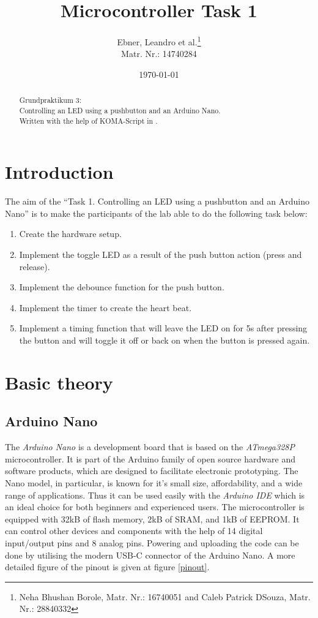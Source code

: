 \documentclass{scrartcl}                    %
\begin{document}
\title{Microcontroller Task 1}
\author{Ebner, Leandro et al.\thanks{Neha Bhushan Borole, Matr. Nr.: 16740051 and Caleb Patrick DSouza, Matr. Nr.: 28840332} \\ Matr. Nr.: 14740284}
\date{\today}
\maketitle

\begin{abstract}
Grundpraktikum 3: \\ Controlling an LED using a pushbutton and an Arduino Nano. \\
Written with the help of KOMA-Script in \LaTeXe{}.
\end{abstract}

\tableofcontents

\section{Introduction}

The aim of the “Task 1. Controlling an LED using a pushbutton and an Arduino Nano” is to make the participants of the lab able to do the following task below:

\begin{enumerate}
    \item Create the hardware setup.
    \item Implement the toggle LED as a result of the push button action (press and release).
    \item Implement the debounce function for the push button.
    \item Implement the timer to create the heart beat.
    \item Implement a timing function that will leave the LED on for 5s after pressing the button and will toggle it off or back on when the button is pressed again.
\end{enumerate}

\section{Basic theory}
    \subsection{Arduino Nano}
    
    The \emph{Arduino Nano} is a development board that is based on the \emph{ATmega328P} microcontroller. It is part of the Arduino family \cite{arduino} of open source hardware and software products, which are designed to facilitate electronic prototyping. The Nano model, in particular, is known for it's small size, affordability, and a wide range of applications. Thus it can be used easily with the \emph{Arduino IDE} which is an ideal choice for both beginners and experienced users. The microcontroller is equipped with 32kB of flash memory, 2kB of SRAM, and 1kB of EEPROM. It can control other devices and components with the help of 14 digital input/output pins and 8 analog pins. Powering and uploading the code can be done by utilising the modern USB-C connector of the Arduino Nano. A more detailed figure of the pinout is given at figure \ref{pinout}.
    
\end{document}
